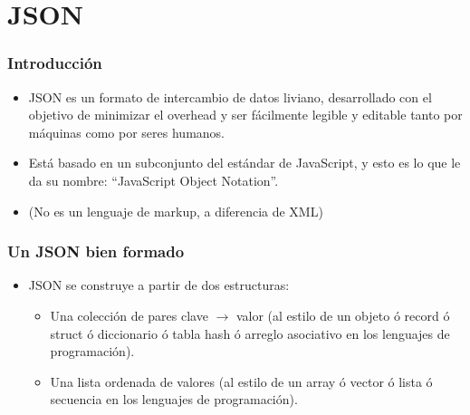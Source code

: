 \section{JSON}
\begin{frame}
\frametitle{Introducción}
\begin{itemize}
\item	JSON es un formato de intercambio de datos liviano, desarrollado con el objetivo de minimizar el overhead y ser fácilmente legible y editable tanto por máquinas como por seres humanos.
		\pause
\item	Está basado en un subconjunto del estándar de JavaScript, y esto es lo que le da su nombre: ``JavaScript Object Notation''.
\pause

\item	(No es un lenguaje de markup, a diferencia de XML)
\end{itemize}
\end{frame}

\begin{frame}
\frametitle{Un JSON bien formado}
\begin{itemize}
\item	JSON se construye a partir de dos estructuras:
		\pause
\begin{itemize}
		\item	Una colección de pares clave $\rightarrow$ valor (al estilo de un objeto ó record ó struct ó diccionario ó tabla hash ó arreglo asociativo en los lenguajes de programación).
				\pause
		\item	Una lista ordenada de valores (al estilo de un array ó vector ó lista ó secuencia en los lenguajes de programación).
\end{itemize}
\end{itemize}
\end{frame}

